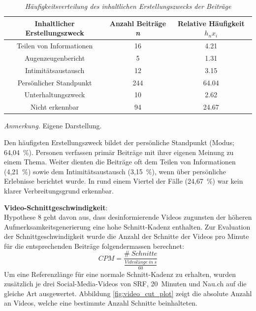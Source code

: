 \documentclass[12pt,a4paper]{article}        %
\begin{document}
\begin{table}
  \centering
  \caption{\textit{Häufigkeitsverteilung des inhaltlichen Erstellungszwecks der Beiträge}}
  \label{tab:results_content_creation_purpose}
  \begin{tabular}{|c|c|c|}\hline
    \textbf{Inhaltlicher Erstellungszweck}&  \textbf{Anzahl Beiträge \textit{n}}& Relative Häufigkeit \({h_n}{x_i}\)\\\hline
    Teilen von Informationen&  16& 4.21\\\hline
    Augenzeugenbericht&  5& 1.31\\\hline
    Intimitätsaustausch&  12& 3.15\\\hline
    Persönlicher Standpunkt&  244& 64.04\\\hline
    Unterhaltungszweck&  10& 2.62\\\hline
    Nicht erkennbar&  94& 24.67\\ \hline
  \end{tabular}
  \footnotesize\textit{Anmerkung.} Eigene Darstellung.
\end{table}
Den häufigsten Erstellungszweck bildet der persönliche Standpunkt (Modus; 64,04 \%). Personen verfassen primär Beiträge mit ihrer eigenen Meinung zu einem Thema. Weiter dienten die Beiträge oft dem Teilen von Informationen (4,21 \%) sowie dem Intimitätsaustausch (3,15 \%), wenn über persönliche Erlebnisse berichtet wurde. In rund einem Viertel der Fälle  (24,67 \%) war kein klarer Verbreitungsgrund erkennbar.

\textbf{Video-Schnittgeschwindigkeit}:\\
Hypothese 8 geht davon aus, dass desinformierende Videos zugunsten der höheren Aufmerksamkeitsgenerierung eine hohe Schnitt-Kadenz enthalten.
Zur Evaluation der Schnittgeschwindigkeit wurde die Anzahl der Schnitte der Videos pro Minute für die entsprechenden Beiträge folgendermassen berechnet:
\[CPM  = \frac{\# \ Schnitte}{\frac{Videolänge\ in\ s}{60}}\]
Um eine Referenzlänge für eine normale Schnitt-Kadenz zu erhalten, wurden zusätzlich je drei Social-Media-Videos von SRF, 20 Minuten und Nau.ch auf die gleiche Art ausgewertet.
Abbildung \ref{fig:video_cut_plot} zeigt die absolute Anzahl an Videos, welche eine bestimmte Anzahl Schnitte beinhalteten.
\end{document}
